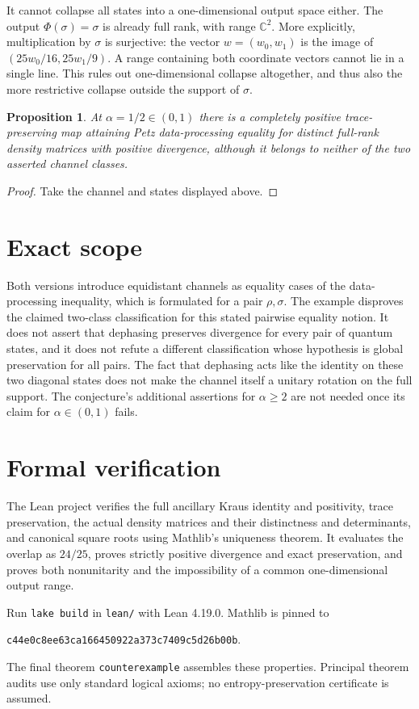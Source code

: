 \documentclass[11pt]{article}
\newtheorem{proposition}{Proposition}
\begin{document}
It cannot collapse all states into a one-dimensional output space either. The output $\Phi(\sigma)=\sigma$ is already full rank, with range $\mathbb C^2$. More explicitly, multiplication by $\sigma$ is surjective: the vector $w=(w_0,w_1)$ is the image of $(25w_0/16,25w_1/9)$. A range containing both coordinate vectors cannot lie in a single line. This rules out one-dimensional collapse altogether, and thus also the more restrictive collapse outside the support of $\sigma$.

\begin{proposition}
At $\alpha=1/2\in(0,1)$ there is a completely positive trace-preserving map attaining Petz data-processing equality for distinct full-rank density matrices with positive divergence, although it belongs to neither of the two asserted channel classes.
\end{proposition}
\begin{proof}
Take the channel and states displayed above.
\end{proof}

\section*{Exact scope}
Both versions introduce equidistant channels as equality cases of the data-processing inequality, which is formulated for a pair $\rho,\sigma$. The example disproves the claimed two-class classification for this stated pairwise equality notion. It does not assert that dephasing preserves divergence for every pair of quantum states, and it does not refute a different classification whose hypothesis is global preservation for all pairs. The fact that dephasing acts like the identity on these two diagonal states does not make the channel itself a unitary rotation on the full support. The conjecture's additional assertions for $\alpha\geq2$ are not needed once its claim for $\alpha\in(0,1)$ fails.

\section*{Formal verification}
The Lean project verifies the full ancillary Kraus identity and positivity, trace preservation, the actual density matrices and their distinctness and determinants, and canonical square roots using Mathlib's uniqueness theorem. It evaluates the overlap as $24/25$, proves strictly positive divergence and exact preservation, and proves both nonunitarity and the impossibility of a common one-dimensional output range.

Run \texttt{lake build} in \texttt{lean/} with Lean 4.19.0. Mathlib is pinned to
\begin{center}\small\texttt{c44e0c8ee63ca166450922a373c7409c5d26b00b}.\end{center}
The final theorem \texttt{counterexample} assembles these properties. Principal theorem audits use only standard logical axioms; no entropy-preservation certificate is assumed.
\end{document}

